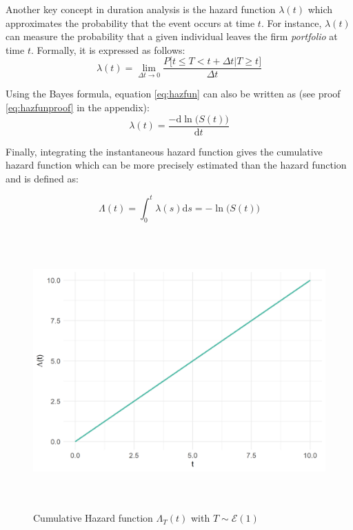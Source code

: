 \documentclass[
]{book}
\begin{document}
Another key concept in duration analysis is the hazard function \(\lambda(t)\) which approximates the probability that the event occurs at time \(t\). For instance, \(\lambda(t)\) can measure the probability that a given individual leaves the firm \emph{portfolio} at time \(t\). Formally, it is expressed as follows:
\begin{equation}
  \lambda(t) = \lim_{\Delta t \to 0} \frac{P\big[t \leq T < t + \Delta t | T \geq t \big]}{\Delta t}
  \label{eq:hazfun}
\end{equation}

Using the Bayes formula, equation \eqref{eq:hazfun} can also be written as (see proof \eqref{eq:hazfunproof} in the appendix):
\begin{equation}
  \lambda(t) = \frac{-\text{d} \ln \big(S(t)\big)}{\text{d} t}
  \label{eq:hazfunbis}
\end{equation}

Finally, integrating the instantaneous hazard function gives the cumulative hazard function which can be more precisely estimated than the hazard function \citep{CAMERON_TRIVEDI} and is defined as:

\begin{equation}
  \Lambda (t) = \int_{0}^{t} \lambda(s) \text{d}s = - \ln \big(S(t)\big)
  \label{eq:cumhazfun}
\end{equation}

\begin{figure}

{\centering \includegraphics[width=400pt,height=300pt]{./imgs/cum_haz_plot} 

}

\caption{Cumulative Hazard function $\Lambda_T(t)$ with $T \sim \mathcal{E} (1)$}\label{fig:cumhazplot}
\end{figure}
\end{document}
